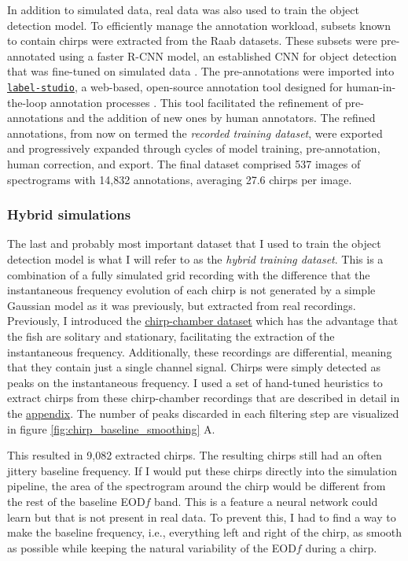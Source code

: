 In addition to simulated data, real data was also used to train the object
detection model. To efficiently manage the annotation workload, subsets known
to contain chirps were extracted from the Raab datasets. These subsets were
pre-annotated using a faster R-CNN model, an established CNN for object
detection that was fine-tuned on simulated data
\parencite{renFasterRCNNRealTime2016}. The pre-annotations were imported into
\href{https://labelstud.io/}{\texttt{label-studio}}, a web-based, open-source
annotation tool designed for human-in-the-loop annotation processes
\parencite{tkachenkoLabelStudioData2022}. This tool facilitated the refinement
of pre-annotations and the addition of new ones by human annotators. The
refined annotations, from now on termed the \emph{recorded training dataset},
were exported and progressively expanded through cycles of model training,
pre-annotation, human correction, and export. The final dataset comprised 537
images of spectrograms with 14,832 annotations, averaging 27.6 chirps per
image.

\subsubsection{Hybrid simulations}

The last and probably most important dataset that I used to train the object
detection model is what I will refer to as the \emph{hybrid training dataset}.
This is a combination of a fully simulated grid recording with the difference
that the instantaneous frequency evolution of each chirp is not generated by a
simple Gaussian model as it was previously, but extracted from real recordings.
Previously, I introduced the \hyperref[sec:ccdata]{chirp-chamber dataset} which
has the advantage that the fish are solitary and stationary, facilitating the
extraction of the instantaneous frequency. Additionally, these recordings are
differential, meaning that they contain just a single channel signal. Chirps
were simply detected as peaks on the instantaneous frequency. I used a set of
hand-tuned heuristics to extract chirps from these chirp-chamber recordings
that are described in detail in the \hyperref[appendix]{appendix}. The number
of peaks discarded in each filtering step are visualized in figure
\ref{fig:chirp_baseline_smoothing} A.

This resulted in 9,082 extracted chirps. The resulting chirps still had an
often jittery baseline frequency. If I would put these chirps directly into the
simulation pipeline, the area of the spectrogram around the chirp would be
different from the rest of the baseline EOD$f$ band. This is a feature a neural
network could learn but that is not present in real data. To prevent this, I
had to find a way to make the baseline frequency, i.e., everything left and
right of the chirp, as smooth as possible while keeping the natural variability
of the EOD$f$ during a chirp.

